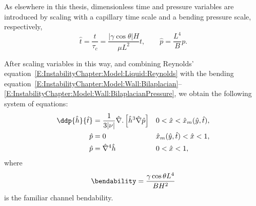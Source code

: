 As elsewhere in this thesis, dimensionless time and pressure variables are introduced by scaling with a capillary time scale and a bending pressure scale, respectively,
\begin{equation}\label{E:InstabilityChapter:Modelling:NonDim:TimeAndPressureScaling}
\hat{t} =\frac{t}{ \tau_c} =  \frac{|\gamma \cos \theta| H}{\mu L^2}t, \qquad \hat{p} = \frac{L^4}{B}p.
\end{equation}

After scaling variables in this way, and combining Reynolds' equation~\eqref{E:InstabilityChapter:Model:Liquid:Reynolds} with the bending equation~\eqref{E:InstabilityChapter:Model:Wall:Bilaplacian}--\eqref{E:InstabilityChapter:Model:Wall:BilaplacianPressure}, we obtain the following system of equations:
\begin{align}
\ddp{\hat{h}}{\hat{t}} &=\frac{1}{3|\nu|}\hat{\nabla}. \left[\hat{h}^3\hat{\nabla}\hat{p}  \right] & & 0 <  \hat{x} < \hat{x}_m(\hat{y},\hat{t}),\label{E:InstabilityChapter:Modelling:NonDim:PDE1}\\
  \hat{p}&=0 & &
\hat{x}_m(\hat{y},\hat{t}) < \hat{x} < 1,\label{E:InstabilityChapter:Modelling:NonDim:PDE2}\\
\hat{p} &=\hat{\nabla}^4 \hat{h}& &0 < \hat{x} < 1,\label{E:InstabilityChapter:Modelling:NonDim:PDE3}
\end{align}
where
\begin{equation}\label{E:InstabilityChapter:Modelling:NonDim:Bendability}
\bendability = \frac{\gamma \cos \theta L^4}{B H^2}
\end{equation}
is the familiar channel bendability.


